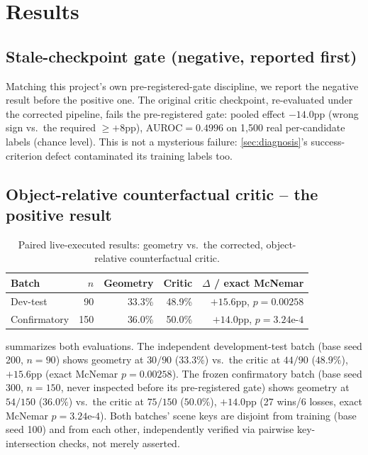\documentclass[journal]{IEEEtran}
\begin{document}
\section{Results}
\label{sec:results}

\subsection{Stale-checkpoint gate (negative, reported first)}
\label{sec:stalegate}

Matching this project's own pre-registered-gate discipline, we report the
negative result before the positive one. The original critic checkpoint,
re-evaluated under the corrected pipeline, fails the pre-registered gate:
pooled effect $-14.0$pp (wrong sign vs.\ the required $\geq+8$pp),
AUROC$=0.4996$ on 1,500 real per-candidate labels (chance level). This is
not a mysterious failure: \cref{sec:diagnosis}'s success-criterion
defect contaminated its training labels too.

\subsection{Object-relative counterfactual critic -- the positive result}
\label{sec:positiveresult}

\begin{table}[t]
\centering
\caption{Paired live-executed results: geometry vs.\ the corrected,
object-relative counterfactual critic.}
\label{tab:positiveresult}
\begin{tabular}{@{}lrrrr@{}}
\toprule
Batch & $n$ & Geometry & Critic & $\Delta$ / exact McNemar \\
\midrule
Dev-test & 90 & 33.3\% & 48.9\% & $+15.6$pp, $p{=}0.00258$ \\
Confirmatory & 150 & 36.0\% & 50.0\% & $+14.0$pp, $p{=}3.24\text{e-}4$ \\
\bottomrule
\end{tabular}
\end{table}

 summarizes both evaluations. The independent
development-test batch (base seed 200, $n{=}90$) shows geometry at
$30/90$ ($33.3\%$) vs.\ the critic at $44/90$ ($48.9\%$), $+15.6$pp
(exact McNemar $p{=}0.00258$). The frozen confirmatory batch (base seed
300, $n{=}150$, never inspected before its pre-registered gate) shows
geometry at $54/150$ ($36.0\%$) vs.\ the critic at $75/150$ ($50.0\%$),
$+14.0$pp (27 wins/6 losses, exact McNemar $p{=}3.24\text{e-}4$). Both
batches' scene keys are disjoint from training (base seed 100) and from
each other, independently verified via pairwise key-intersection checks,
not merely asserted.
\end{document}
